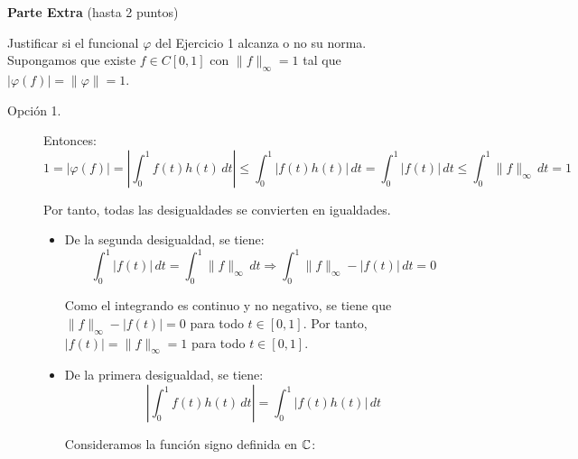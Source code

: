 \documentclass[12pt]{article}
\begin{document}
    \noindent
    \textbf{Parte Extra} (hasta 2 puntos)
    \begin{ejercicio}
        Justificar si el funcional $\varphi$ del Ejercicio 1 alcanza o no su norma.\\

        Supongamos que existe $f \in C[0, 1]$ con $\|f\|_\infty = 1$ tal que $|\varphi(f)| = \|\varphi\| = 1$.    
        \begin{description}
            \item[Opción 1.] Entonces:
            \begin{equation*}
                1 = |\varphi(f)| = \left|\int_0^1 f(t) h(t)\,dt\right| \leq \int_0^1 |f(t) h(t)|\,dt = \int_0^1 |f(t)|\,dt \leq \int_0^1 \|f\|_\infty\,dt = 1
            \end{equation*}
            
            Por tanto, todas las desigualdades se convierten en igualdades.
            \begin{itemize}
                \item De la segunda desigualdad, se tiene:
                \begin{equation*}
                    \int_0^1 |f(t)|\,dt = \int_0^1 \|f\|_\infty\,dt \Longrightarrow
                    \int_0^1 \|f\|_\infty - |f(t)|\,dt = 0
                \end{equation*}

                Como el integrando es continuo y no negativo, se tiene que $\|f\|_\infty - |f(t)| = 0$ para todo $t \in [0, 1]$. Por tanto, $|f(t)| = \|f\|_\infty = 1$ para todo $t \in [0, 1]$.
                \item De la primera desigualdad, se tiene:
                \begin{equation*}
                    \left|\int_0^1 f(t) h(t)\,dt\right| = \int_0^1 |f(t) h(t)|\,dt
                \end{equation*}

                Consideramos la función signo definida en $\mathbb{C}$:
                

\end{itemize}
\end{description}
\end{ejercicio}
\end{document}
